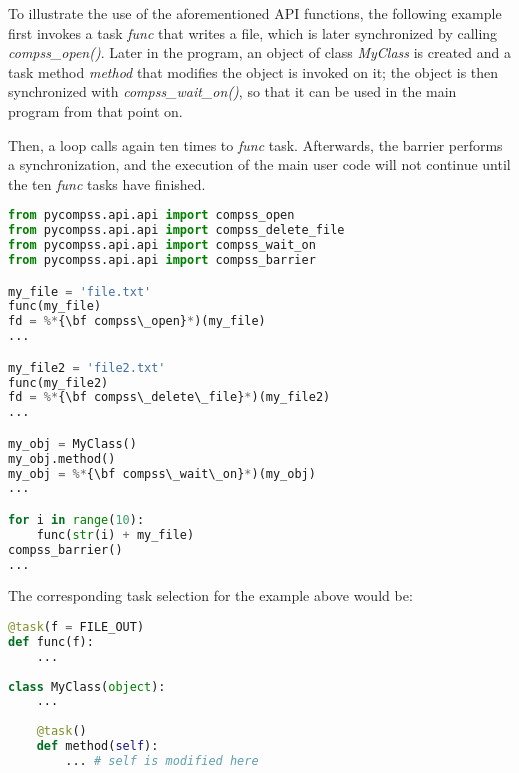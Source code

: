 To illustrate the use of the aforementioned API functions, the following example first invokes a task 
{\it func} that writes a file, which is later synchronized by calling {\it compss\_open()}. 
Later in the program, an object of class {\it MyClass} is created and a task method {\it method} 
that modifies the object is invoked on it; the object is then synchronized with {\it compss\_wait\_on()}, 
so that it can be used in the main program from that point on.

Then, a loop calls again ten times to {\it func} task.
Afterwards, the barrier performs a synchronization, and the execution of the main user code will
not continue until the ten {\it func} tasks have finished.

\begin{lstlisting}[language=python]
from pycompss.api.api import compss_open
from pycompss.api.api import compss_delete_file
from pycompss.api.api import compss_wait_on
from pycompss.api.api import compss_barrier

my_file = 'file.txt'
func(my_file)
fd = %*{\bf compss\_open}*)(my_file)
...

my_file2 = 'file2.txt'
func(my_file2)
fd = %*{\bf compss\_delete\_file}*)(my_file2)
...

my_obj = MyClass()
my_obj.method()
my_obj = %*{\bf compss\_wait\_on}*)(my_obj)
...

for i in range(10):
    func(str(i) + my_file)
compss_barrier()
...
\end{lstlisting}

The corresponding task selection for the example above would be:

\begin{lstlisting}[language=python]
@task(f = FILE_OUT)
def func(f):
    ...
    
class MyClass(object):
    ...
    
    @task()
    def method(self):
        ... # self is modified here
\end{lstlisting}

